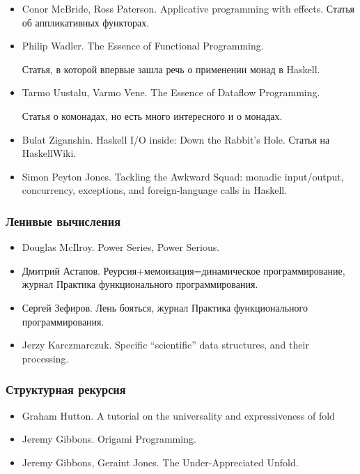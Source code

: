 \begin{itemize}
\item Conor McBride, Ross Paterson. Applicative programming with effects.
    Статья об аппликативных функторах.

\item Philip Wadler. The Essence of Functional Programming.
     
    Статья, в которой впервые зашла речь о применении монад
        в Haskell.

\item Tarmo Uustalu, Varmo Vene. The Essence of Dataflow Programming.
    
    Статья о комонадах, но есть много интересного и о монадах.

\item Bulat Ziganshin. Haskell I/O inside: Down the Rabbit's Hole. 
    Статья на HaskellWiki.

\item Simon Peyton Jones. Tackling the Awkward Squad:
    monadic input/output, concurrency, exceptions, and
    foreign-language calls in Haskell.
\end{itemize}

\subsubsection{Ленивые вычисления}

\begin{itemize}
\item Douglas McIlroy. Power Series, Power Serious.

\item Дмитрий Астапов. Реурсия+мемоизация=динамическое программирование,
    журнал Практика функционального программирования.

\item Сергей Зефиров. Лень бояться, журнал Практика функционального
    программирования.

\item Jerzy Karczmarczuk. Specific “scientific” data structures, 
    and their processing.



\end{itemize}

\subsubsection{Структурная рекурсия}

\begin{itemize}
\item Graham Hutton. A tutorial on the universality
    and expressiveness of fold

\item Jeremy Gibbons. Origami Programming.

\item Jeremy Gibbons, Geraint Jones. The Under-Appreciated Unfold. 

\end{itemize}

